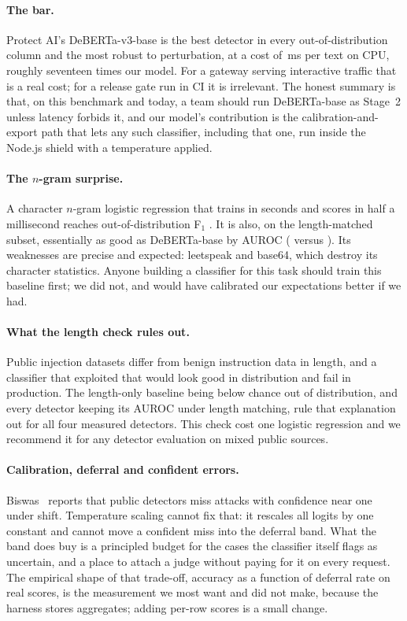 \documentclass[10pt,a4paper]{article}
\newcommand{\ms}{\,ms}
\begin{document}
\paragraph{The bar.} Protect AI's DeBERTa-v3-base is the best detector in every out-of-distribution column and the most robust to perturbation, at a cost of \mprotectaidebertavtwotestoodlatency\ms{} per text on CPU, roughly seventeen times our model. For a gateway serving interactive traffic that is a real cost; for a release gate run in CI it is irrelevant. The honest summary is that, on this benchmark and today, a team should run DeBERTa-base as Stage~2 unless latency forbids it, and our model's contribution is the calibration-and-export path that lets any such classifier, including that one, run inside the Node.js shield with a temperature applied.

\paragraph{The $n$-gram surprise.} A character $n$-gram logistic regression that trains in seconds and scores in half a millisecond reaches out-of-distribution F$_1$ \mngramlrtestoodfone{}. It is also, on the length-matched subset, essentially as good as DeBERTa-base by AUROC (\mngramlrtestoodlmauroc{} versus \mprotectaidebertavtwotestoodlmauroc). Its weaknesses are precise and expected: leetspeak and base64, which destroy its character statistics. Anyone building a classifier for this task should train this baseline first; we did not, and would have calibrated our expectations better if we had.

\paragraph{What the length check rules out.} Public injection datasets differ from benign instruction data in length, and a classifier that exploited that would look good in distribution and fail in production. The length-only baseline being below chance out of distribution, and every detector keeping its AUROC under length matching, rule that explanation out for all four measured detectors. This check cost one logistic regression and we recommend it for any detector evaluation on mixed public sources.

\paragraph{Calibration, deferral and confident errors.} Biswas~\cite{biswas2026confidently} reports that public detectors miss attacks with confidence near one under shift. Temperature scaling cannot fix that: it rescales all logits by one constant and cannot move a confident miss into the deferral band. What the band does buy is a principled budget for the cases the classifier itself flags as uncertain, and a place to attach a judge without paying for it on every request. The empirical shape of that trade-off, accuracy as a function of deferral rate on real scores, is the measurement we most want and did not make, because the harness stores aggregates; adding per-row scores is a small change.
\end{document}
